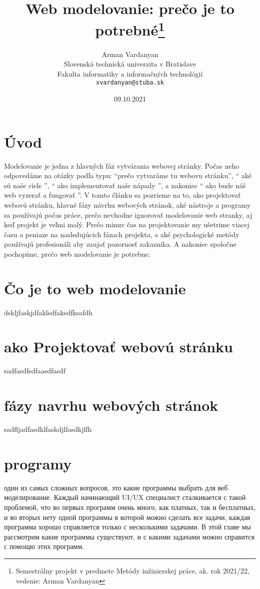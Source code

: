 \documentclass[10pt,twoside,slovak,a4paper]{article}
\title{Web modelovanie: prečo je to potrebné\thanks{Semestrálny projekt v predmete Metódy inžinierskej práce, ak. rok 2021/22, vedenie: Arman Vardanyan}} %
\author{Arman Vardanyan\\[2pt]
	{\small Slovenská technická univerzita v Bratislave}\\
	{\small Fakulta informatiky a informačných technológií}\\
	{\small \texttt{xvardanyan@stuba.sk}}
	}
\date{\small 09.10.2021} %
\begin{document}
\maketitle

\begin{center}
    
\end{center}

\section{Úvod}

Modelovanie je jedna z hlavných fáz vytvárania webovej stránky. Počas neho odpovedáme na otázky podľa typu: “prečo vytvaráme tu webovu stránku”, “ aké sú naše ciele ”, “ ako implementovať naše nápady ”, a nakoniec “ ako bude náš web vyzerať a fungovať ”. V tomto článku sa pozrieme na to, ako projektovať webovú stránku, hlavné fázy návrhu webových stránok, aké nástroje a programy sa používajú počas práce, prečo nevhodne ignorovať modelovanie web stranky, aj keď projekt je veľmi malý. Prečo minuv čas na projektovanie my ušetrime viacej času a peniaze na nasledujúcich fázach projekta, a aké psychologické metódy používajú profesionáli aby zaujať pozornosť zakaznika. A nakoniec spoločne pochopíme, prečo web modelovanie je potrebne.


\section{Čo je to web modelovanie}

dskljfaskjdfaklsdfaksdfksafdh

\section{ako Projektovať webovú stránku}

sadfasdfsdfaasdfasdf

\section{fázy navrhu webových stránok}

sadfljadfasdklfaskdjlfasdkjlfh

\section{programy}

один из самых сложных вопросов, это какие программы выбрать для веб моделирование. Каждый начинающий UI/UX специалист сталкивается с такой проблемой, что во первых программ очень много, как платных, так и бесплатных, и во вторых нету одной программы в которой можно сделать все задачи, каждая программа хорошо справляется только с несколькими задачами. В этой главе мы рассмотрим какие программы существуют, и с какими задачами можно справится с помощю этих программ.
\end{document}
